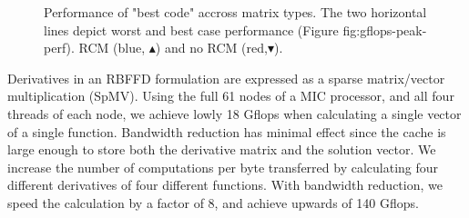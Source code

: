 \documentclass[10pt,conference,compsocconf]{IEEEtran}
\begin{document}
\begin{figure}[t]
  \centering

  \caption{Performance of "best code" accross matrix types. The two horizontal lines depict worst and 
  best case performance (Figure fig:gflops-peak-perf). RCM (blue, $\blacktriangle$) and no RCM (red,$\blacktriangledown$).}
\end{figure}



Derivatives in an RBFFD formulation are expressed as a sparse
matrix/vector multiplication (SpMV). Using the full 61 nodes of a MIC
processor, and all four threads of each node, we achieve lowly 18
Gflops when calculating a single vector of a single
function. Bandwidth reduction has minimal effect since the cache is
large enough to store both the derivative matrix and the solution
vector. We increase the number of computations per byte transferred by
calculating four different derivatives of four different
functions. With bandwidth reduction, we speed the calculation by a
factor of 8, and achieve upwards of 140 Gflops.
\end{document}
